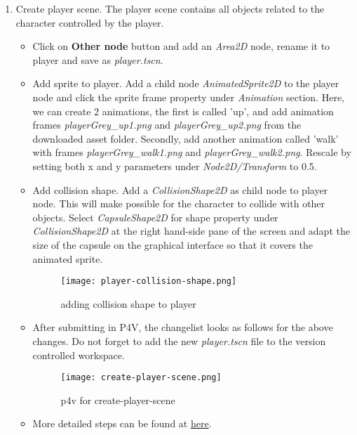 \begin{enumerate}
    \item Create player scene. The player scene contains all objects related to the character controlled by the player.
    \begin{itemize}
        \item Click on \textbf{Other node} button and add an \textit{Area2D} node, rename it to player and save as 
        \textit{player.tscn}.
        \item \label{animation} Add sprite to player. Add a child node \textit{AnimatedSprite2D} to the player node and click the sprite frame
        property under \textit{Animation} section. Here, we can create 2 animations, the first is called 'up', and add 
        animation frames \textit{playerGrey\_up1.png} and \textit{playerGrey\_up2.png} from the downloaded asset folder.
        Secondly, add another animation called 'walk' with frames 
        \textit{playerGrey\_walk1.png} and \textit{playerGrey\_walk2.png}. Rescale by setting both x and y parameters under 
        \textit{Node2D/Transform} to 0.5.
        \item Add collision shape. Add a \textit{CollisionShape2D} as child node to player node. This will make possible
        for the character to collide with other objects. Select \textit{CapsuleShape2D} for shape property under 
        \textit{CollisionShape2D} at the right hand-side pane of the screen and adapt the size of the capsule on the 
        graphical interface so that it covers the animated sprite.
        \begin{figure}[H]
            \centering
            \texttt{[image: player-collision-shape.png]}
              \caption{adding collision shape to player}
              \label{fig:player-collision-shape}
        \end{figure}
        \item After submitting in P4V, the changelist looks as follows for the above changes. Do not forget to add 
        the new \textit{player.tscn} file to the version controlled workspace.
        \begin{figure}[H]
            \centering
            \texttt{[image: create-player-scene.png]}
              \caption{p4v for create-player-scene}
              \label{fig:create-player-scene}
        \end{figure}
        \item More detailed steps can be found at 
        \href{https://docs.godotengine.org/en/stable/getting_started/first_2d_game/02.player_scene.html}{\color{blue}here}.
    \end{itemize}
\end{enumerate}
